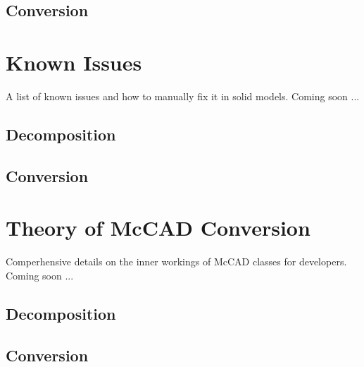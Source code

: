 \documentclass[letterpaper, 10 pt]{report}
\begin{document}
\subsection{Conversion}


\section{Known Issues}
A list of known issues and how to manually fix it in solid models. Coming soon ...
\subsection{Decomposition}
\subsection{Conversion}


\section{Theory of McCAD Conversion}
Comperhensive details on the inner workings of McCAD classes for developers. Coming soon ...
\subsection{Decomposition}
\subsection{Conversion}
\newpage
%

\end{document}
